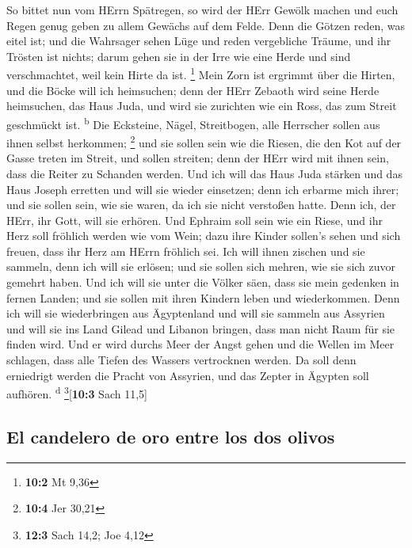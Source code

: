  So bittet nun vom HErrn Spätregen, so wird der HErr
Gewölk machen und euch Regen genug geben zu allem Gewächs auf dem Felde.
 Denn die Götzen reden, was eitel ist; und die Wahrsager
sehen Lüge und reden vergebliche Träume, und ihr Trösten ist nichts;
darum gehen sie in der Irre wie eine Herde und sind verschmachtet, weil
kein Hirte da ist. \footnote{\textbf{10:2} Mt 9,36}  Mein
Zorn ist ergrimmt über die Hirten, und die Böcke will ich heimsuchen;
denn der HErr Zebaoth wird seine Herde heimsuchen, das Haus Juda, und
wird sie zurichten wie ein Ross, das zum Streit geschmückt ist.
\textsuperscript{b}  Die Ecksteine, Nägel, Streitbogen,
alle Herrscher sollen aus ihnen selbst herkommen; \footnote{\textbf{10:4}
  Jer 30,21}  und sie sollen sein wie die Riesen, die den
Kot auf der Gasse treten im Streit, und sollen streiten; denn der HErr
wird mit ihnen sein, dass die Reiter zu Schanden werden. 
Und ich will das Haus Juda stärken und das Haus Joseph erretten und will
sie wieder einsetzen; denn ich erbarme mich ihrer; und sie sollen sein,
wie sie waren, da ich sie nicht verstoßen hatte. Denn ich, der HErr, ihr
Gott, will sie erhören.  Und Ephraim soll sein wie ein
Riese, und ihr Herz soll fröhlich werden wie vom Wein; dazu ihre Kinder
sollen's sehen und sich freuen, dass ihr Herz am HErrn fröhlich sei.
 Ich will ihnen zischen und sie sammeln, denn ich will sie
erlösen; und sie sollen sich mehren, wie sie sich zuvor gemehrt haben.
 Und ich will sie unter die Völker säen, dass sie mein
gedenken in fernen Landen; und sie sollen mit ihren Kindern leben und
wiederkommen.  Denn ich will sie wiederbringen aus
Ägyptenland und will sie sammeln aus Assyrien und will sie ins Land
Gilead und Libanon bringen, dass man nicht Raum für sie finden wird.
 Und er wird durchs Meer der Angst gehen und die Wellen
im Meer schlagen, dass alle Tiefen des Wassers vertrocknen werden. Da
soll denn erniedrigt werden die Pracht von Assyrien, und das Zepter in
Ägypten soll aufhören. \textsuperscript{d} \footnote{\textbf{12:3} Sach
  14,2; Joe 4,12}{[}\textbf{10:3} Sach 11,5{]}

\hypertarget{el-candelero-de-oro-entre-los-dos-olivos}{%
\subsection{El candelero de oro entre los dos
olivos}\label{el-candelero-de-oro-entre-los-dos-olivos}}

